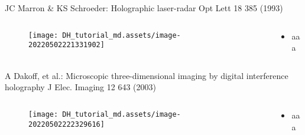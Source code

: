 \documentclass[t, aspectratio=169]{beamer}
\begin{document}
\begin{frame}{JC Marron \& KS Schroeder: Holographic laser-radar}
	\vspace{-3 mm}
	\small Opt Lett 18 385 (1993)
	\begin{columns}
		\begin{column}{.6\textwidth}
			\begin{figure}
				\texttt{[image: DH\_tutorial\_md.assets/image-20220502221331902]}
			\end{figure}
		\end{column}
		\begin{column}{.4\textwidth}
			\begin{itemize}
				\item aaa
			\end{itemize}
		\end{column}
	\end{columns}
\end{frame}




\begin{frame}{A Dakoff, et al.: Microscopic three-dimensional imaging by digital interference holography}
	\vspace{-3 mm}
	\small J Elec. Imaging 12 643 (2003)
	\begin{columns}
		\begin{column}{.6\textwidth}
			\begin{figure}
				\texttt{[image: DH\_tutorial\_md.assets/image-20220502222329616]}
			\end{figure}
		\end{column}
		\begin{column}{.4\textwidth}
			\begin{itemize}
				\item aaa
			\end{itemize}
		\end{column}
	\end{columns}
\end{frame}


\end{document}
